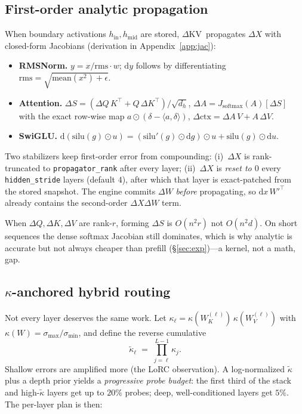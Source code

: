 \documentclass{article}
\newcommand{\dkv}{$\Delta$KV}
\begin{document}
\subsection{First-order analytic propagation}
\label{sec:analytic}

When boundary activations $h_{\mathrm{in}},h_{\mathrm{mid}}$ are stored,
\dkv\ propagates $\Delta X$ with closed-form Jacobians
(derivation in Appendix~\ref{app:jac}):
\begin{itemize}[leftmargin=1.2em,itemsep=1pt]
\item \textbf{RMSNorm.}
$y = x/{\mathrm{rms}}\cdot w$;
$\mathrm{d}y$ follows by differentiating $\mathrm{rms}=\sqrt{\mathrm{mean}(x^2)+\epsilon}$.
\item \textbf{Attention.}
$\Delta S = (\Delta Q\,K^\top + Q\,\Delta K^\top)/\sqrt{d_h}$,
$\Delta A = J_{\mathrm{softmax}}(A)[\Delta S]$ with the exact row-wise
map $a\odot(\delta-\langle a,\delta\rangle)$,
$\Delta\mathrm{ctx}=\Delta A\,V + A\,\Delta V$.
\item \textbf{SwiGLU.}
$\mathrm{d}(\mathrm{silu}(g)\odot u)
 = (\mathrm{silu}'(g)\odot\mathrm{d}g)\odot u + \mathrm{silu}(g)\odot\mathrm{d}u$.
\end{itemize}
Two stabilizers keep first-order error from compounding:
(i)~$\Delta X$ is rank-truncated to \texttt{propagator\_rank} after every
layer;
(ii)~$\Delta X$ is \emph{reset to $0$} every \texttt{hidden\_stride}
layers (default $4$), after which that layer is exact-patched from the
stored snapshot.
The engine commits $\Delta W$ \emph{before} propagating, so
$\mathrm{d}x\,{W'}^\top$ already contains the second-order
$\Delta X\Delta W$ term.

When $\Delta Q,\Delta K,\Delta V$ are rank-$r$, forming $\Delta S$ is
$O(n^2 r)$ not $O(n^2 d)$.
On short sequences the dense softmax Jacobian still dominates, which is
why analytic is accurate but not always cheaper than prefill
(\S\ref{sec:exp})---a kernel, not a math, gap.

\subsection{\texorpdfstring{$\kappa$}{k}-anchored hybrid routing}
\label{sec:hybrid}

Not every layer deserves the same work.
Let $\kappa_\ell=\kappa(W_K^{(\ell)})\,\kappa(W_V^{(\ell)})$ with
$\kappa(W)=\sigma_{\max}/\sigma_{\min}$, and define the reverse cumulative
\begin{equation}
  \tilde\kappa_\ell \;=\; \prod_{j=\ell}^{L-1} \kappa_j.
\end{equation}
Shallow errors are amplified more (the LoRC observation).
A log-normalized $\tilde\kappa$ plus a depth prior yields a
\emph{progressive probe budget}: the first third of the stack and
high-$\tilde\kappa$ layers get up to $20\%$ probes; deep, well-conditioned
layers get $5\%$.
The per-layer plan is then:
\end{document}

